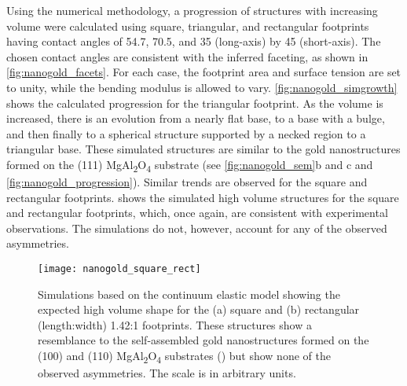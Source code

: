 Using the numerical methodology, a progression of structures with increasing volume were calculated using square, triangular, and rectangular footprints having contact angles of 54.7\degree, 70.5\degree, and 35\degree{} (long-axis) by 45\degree{} (short-axis).
The chosen contact angles are consistent with the inferred faceting, as shown in \cref{fig:nanogold_facets}.
For each case, the footprint area and surface tension are set to unity, while the bending modulus is allowed to vary.
\cref{fig:nanogold_simgrowth} shows the calculated progression for the triangular footprint.
As the volume is increased, there is an evolution from a nearly flat base, to a base with a bulge, and then finally to a spherical structure supported by a necked region to a triangular base.
These simulated structures are similar to the gold nanostructures formed on the (111) MgAl\textsubscript{2}O\textsubscript{4} substrate (see \cref{fig:nanogold_sem}b and c and \cref{fig:nanogold_progression}).
Similar trends are observed for the square and rectangular footprints.
 shows the simulated high volume structures for the square and rectangular footprints, which, once again, are consistent with experimental observations.
The simulations do not, however, account for any of the observed asymmetries.
\begin{figure}
 \centering \texttt{[image: nanogold\_square\_rect]}
 \caption[Simulations of square and rectangular base gold nanostructures]{\label{fig:nanogold_square_rect}Simulations based on the continuum elastic model showing the expected high volume shape for the (a) square and (b) rectangular (length:width) 1.42:1 footprints.
  These structures show a resemblance to the self-assembled gold nanostructures formed on the (100) and (110) MgAl\textsubscript{2}O\textsubscript{4} substrates () but show none of the observed asymmetries.
  The scale is in arbitrary units.}
\end{figure}

